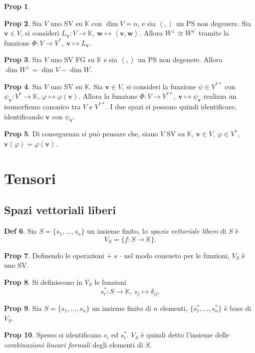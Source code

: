 \documentclass[]{article}
\newcommand{\vv}{\mathbf{v}}
\newcommand{\vw}{\mathbf{w}}
\newcommand{\scalprod}[2]{\left\langle #1 , #2 \right\rangle}
\theoremstyle{definition}
\theoremstyle{definition}
\newtheorem{prop}{Prop}[subsection]
\theoremstyle{definition}
\newtheorem{dfn}[prop]{Def}
\begin{document}
\begin{prop}
\end{prop} \begin{prop} Sia $V$ uno SV su $\mathbb{K}$ con $\dim V = n$, e sia $\scalprod{}{}$ un PS non degenere. Sia $\vv \in V$, si consideri $L_{\vv}:V \to \mathbb{K}, \ \vw \mapsto \scalprod{\vv}{\vw}$. Allora $W^{\perp} \cong W^{\checkmark}$ tramite la funzione $\Phi :V \to V^*, \ \vv \mapsto L_{\vv}$.

\end{prop} \begin{prop} Sia $V$ uno SV FG su $\mathbb{K}$ e sia $\scalprod{}{}$ un PS non degenere. Allora $\dim W^{\perp}= \dim V - \dim W$.

\end{prop} \begin{prop} Sia $V$ uno SV su $\mathbb{K}$. Sia $\vv \in V$, si consideri la funzione $\psi \in V^{**}$ con $\psi_{\vv}:V^* \to \mathbb{K},\ \varphi \mapsto \varphi(\vv)$. Allora la funzione $\Phi:V \to V^{**},\ \vv \mapsto \psi_{\vv}$ realizza un isomorfismo canonico tra $V$ e $V^{**}$. I due spazi si possono quindi identificare, identificando $\vv$ con $\psi_{\vv}$.

\end{prop} \begin{prop} Di conseguenza si può pensare che, siano $V$ SV su $\mathbb{K}$, $\vv \in V,\ \varphi \in V^{*}$, $\vv(\varphi)=\varphi(\vv)$.
\end{prop}


\section{Tensori} 
\subsection{Spazi vettoriali liberi}

 \begin{dfn} Sia $S= \{ s_1 ,..., s_n \}$ un insieme finito, lo \emph{spazio vettoriale libero} di $S$ è 
$$V_S = \{ f:S \to \mathbb{K} \}.$$

 \end{dfn} \begin{prop} Definendo le operazioni $+$ e $\cdot$ nel modo consueto per le funzioni, $V_S$ è uno SV.

\end{prop} \begin{prop} Si definiscono in $V_S$ le funzioni 
$$s^* _i :S \to \mathbb{K}, \ s_j \mapsto \delta _{ij}. $$

\end{prop} \begin{prop} Sia $S= \{ s_1 ,..., s_n \}$ un insieme finito di $n$ elementi, $\{ s_1 ^* ,..., s_n ^* \}$ è base di $V_S$.

\end{prop} \begin{prop} Spesso si identificano $s_i$ ed $s_i ^*$. $V_S$ è quindi detto l'insieme delle \emph{combinazioni lineari formali} degli elementi di $S$.
\end{prop}
\end{document}
